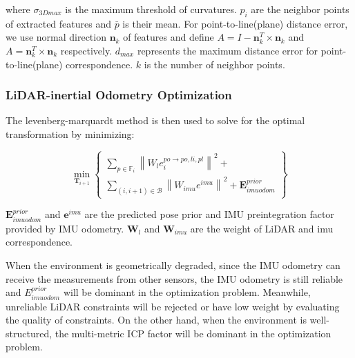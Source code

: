 where $\sigma_{3Dmax}$ is the maximum threshold of curvatures.
$p_{i}$ are the neighbor points of extracted features and $\bar p$ is their mean. For point-to-line(plane) distance error, we use normal direction $\mathbf{n}_{k}$ of features and define $A=I-\mathbf{n}_{k}^T \times \mathbf{n}_{k}$ and $A=\mathbf{n}_{k}^T \times \mathbf{n}_{k}$ respectively.
$d_{max}$ represents the maximum distance error for point-to-line(plane) correspondence. $k$ is the number of neighbor points.  

\subsubsection{\textbf{LiDAR-inertial Odometry Optimization}} The levenberg-marquardt method is then used to solve for the optimal transformation by minimizing:

\begin{equation}
\mathop {\min }\limits_{{\mathbf{T}_{i + 1}}} \left\{ {\left. {\begin{array}{*{20}{c}}
{\sum\limits_{p \in {\mathbb{F}_{i}}} {{{\left\| {{W_l}e_i^{po \to po,li,pl}} \right\|}^2} + } }\\
{\sum\limits_{\left( {i,i + 1} \right) \in \mathcal{B} } {{{\left\| {{W_{imu}}{e^{imu}}} \right\|}^2} + \mathbf{E}_{imuodom}^{prior}} }
\end{array}} \right\}} \right.
\end{equation}

$\mathbf{E}_{imuodom}^{prior}$  and $\mathbf{e}_{}^{imu}$ are the predicted pose prior and IMU preintegration factor provided by IMU odometry. $\mathbf{W}_{l}$ and $\mathbf{W}_{imu}$ are the weight of LiDAR and imu correspondence.  

When the environment is geometrically degraded, since the IMU odometry can receive the measurements from other sensors, the IMU odometry is still reliable and $E_{imuodom}^{prior}$ will be dominant in the optimization problem. Meanwhile, unreliable LiDAR constraints will be rejected or have low weight by evaluating the quality of constraints. On the other hand, when the environment is well-structured, the multi-metric ICP factor will be dominant in the optimization problem. 


